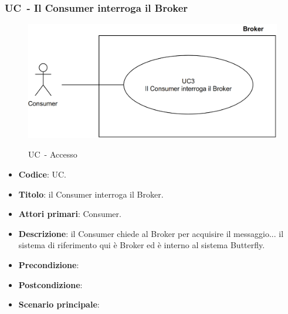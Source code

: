 \subsubsection{UC\theuccount\ - Il Consumer interroga il Broker}
	\begin{figure}[H]
		\centering
		\includegraphics[width=\columnwidth]{img/UC3.png}\\
		\caption{UC\theuccount\ - Accesso}
	\end{figure}
	\begin{itemize}
		\item \textbf{Codice}: UC\theuccount.

		\item \textbf{Titolo}: il Consumer interroga il Broker.
		\item \textbf{Attori primari}: Consumer.
		\item \textbf{Descrizione}: il Consumer chiede al Broker per acquisire il messaggio... il sistema di riferimento qui è Broker ed è interno al sistema Butterfly.
		\item \textbf{Precondizione}:
		\item \textbf{Postcondizione}:
		\item \textbf{Scenario principale}: 
	\end{itemize}

